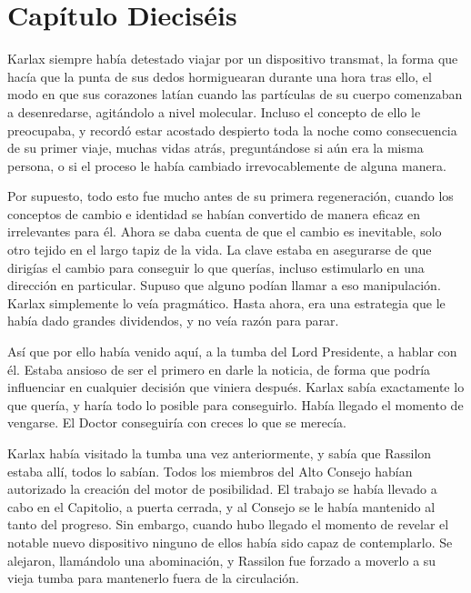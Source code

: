 \chapter*{Capítulo Dieciséis}




Karlax siempre había detestado viajar por un dispositivo transmat, la forma que hacía que la punta de sus dedos hormiguearan durante una hora tras ello, el modo en que sus corazones latían cuando las partículas de su cuerpo comenzaban a desenredarse, agitándolo a nivel molecular. Incluso el concepto de ello le preocupaba, y recordó estar acostado despierto toda la noche como consecuencia de su primer viaje, muchas vidas atrás, preguntándose si aún era la misma persona, o si el proceso le había cambiado irrevocablemente de alguna manera.

Por supuesto, todo esto fue mucho antes de su primera regeneración, cuando los conceptos de cambio e identidad se habían convertido de manera eficaz en irrelevantes para él. Ahora se daba cuenta de que el cambio es inevitable, solo otro tejido en el largo tapiz de la vida. La clave estaba en asegurarse de que dirigías el cambio para conseguir lo que querías, incluso estimularlo en una dirección en particular. Supuso que alguno podían llamar a eso manipulación. Karlax simplemente lo veía pragmático. Hasta ahora, era una estrategia que le había dado grandes dividendos, y no veía razón para parar.

Así que por ello había venido aquí, a la tumba del Lord Presidente, a hablar con él. Estaba ansioso de ser el primero en darle la noticia, de forma que podría influenciar en cualquier decisión que viniera después. Karlax sabía exactamente lo que quería, y haría todo lo posible para conseguirlo. Había llegado el momento de vengarse. El Doctor conseguiría con creces lo que se merecía.

Karlax había visitado la tumba una vez anteriormente, y sabía que Rassilon estaba allí, todos lo sabían. Todos los miembros del Alto Consejo habían autorizado la creación del motor de posibilidad. El trabajo se había llevado a cabo en el Capitolio, a puerta cerrada, y al Consejo se le había mantenido al tanto del progreso. Sin embargo, cuando hubo llegado el momento de revelar el notable nuevo dispositivo ninguno de ellos había sido capaz de contemplarlo. Se alejaron, llamándolo una abominación, y Rassilon fue forzado a moverlo a su vieja tumba para mantenerlo fuera de la circulación.

